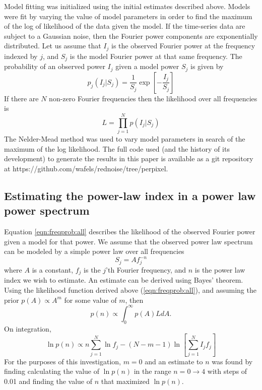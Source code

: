 \documentclass[onecolumn]{emulateapj}
\begin{document}
Model fitting was initialized using the initial estimates described
above.  Models were fit by varying the value of model parameters in
order to find the maximum of the log of likelihood of the data given
the model.  If the time-series data are subject to a Gaussian noise,
then the Fourier power components are exponentially distributed.  Let
us assume that $I_{j}$ is the observed Fourier power at the frequency
indexed by $j$, and $S_{j}$ is the model Fourier power at that same
frequency.  The probability of an observed power $I_{j}$ given a model
power $S_{j}$ is given by
\begin{equation}
p_{j}\left(I_{j}|S_{j}\right) =
\frac{1}{S_{j}}\exp\left[-\frac{I_{j}}{S_{j}}\right]
\label{eqn:freqprob}
\end{equation}
If there are $N$ non-zero Fourier frequencies then the likelihood over
all frequencies is
\begin{equation}
L=\prod_{j=1}^{N}p\left(I_{j}|S_{j}\right)
\label{eqn:freqprob:all}
\end{equation}
The Nelder-Mead method was used to vary model parameters in search of
the maximum of the log likelihood.  The full code used (and the
history of its development) to generate the results in this paper is
available as a git repository at
https://github.com/wafels/rednoise/tree/perpixel.

\subsection{Estimating the power-law index in a power law power spectrum}\label{sec:app:est}
Equation \ref{eqn:freqprob:all} describes the likelihood of the
observed Fourier power given a model for that power.  We assume that
the observed power law spectrum can be modeled by a simple power law
over all frequencies
\begin{equation}
S_{j} = Af_{j}^{-n}
\end{equation}
where $A$ is a constant, $f_{j}$ is the $j$'th Fourier frequency, and
$n$ is the power law index we wish to estimate.  An estimate can be
derived using Bayes' theorem. Using the likelihood function derived
above (\ref{eqn:freqprob:all}), and assuming the prior $p(A)\propto
A^{m}$ for some value of $m$, then 
\begin{equation}
p(n) \propto \int_{0}^{\infty} p(A) L dA.
\label{eqn:bayes}
\end{equation}
On integration,
\begin{equation}
\ln p(n) \propto n\sum_{j=1}^{N}\ln f_{j} - (N-m-1)\ln\left[\sum_{j=1}^{N}I_{j}f_{j}
\right]
\label{eqn:pnlog}
\end{equation}
For the purposes of this investigation, $m=0$ and an estimate to $n$
was found by finding calculating the value of $\ln p(n)$ in the range
$n=0\rightarrow4$ with steps of 0.01 and finding the value of $n$ that
maximized $\ln p(n)$.
\end{document}
